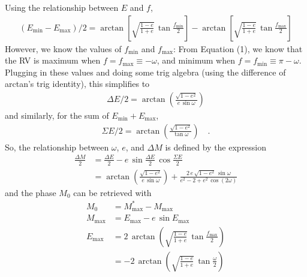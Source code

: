 \documentclass{article}
\begin{document}
Using the relationship between $E$ and $f$,
\begin{align}
    (E_{\mathrm{min}} - E_{\mathrm{max}})/2 =
        \arctan\left[ \sqrt{\frac{1-e}{1+e}} \,
            \tan \frac{f_{\mathrm{min}}}{2} \right] -
        \arctan\left[ \sqrt{\frac{1-e}{1+e}} \,
            \tan \frac{f_{\mathrm{max}}}{2} \right]
\end{align}
However, we know the values of $f_{\mathrm{min}}$ and $f_{\mathrm{max}}$: From
Equation (1), we know that the RV is maximum when $f=f_{\mathrm{max}} \equiv
-\omega$, and minimum when $f=f_{\mathrm{min}} \equiv \pi-\omega$.
Plugging in these values and doing some trig algebra (using the difference of
arctan's trig identity), this simplifies to
\begin{align}
    \Delta E / 2 = \arctan\left(\frac{\sqrt{1 - e^2}}{e\,\sin\omega}\right)
\end{align}
and similarly, for the sum of $E_{\mathrm{min}} + E_{\mathrm{max}}$,
\begin{align}
    \Sigma E / 2 = \arctan\left(\frac{\sqrt{1 - e^2}}{\tan\omega}\right)
        \quad .
\end{align}
So, the relationship between $\omega$, $e$, and $\Delta M$ is defined by the
expression
\begin{align}
    \frac{\Delta M}{2} &= \frac{\Delta E}{2} -
        e\, \sin\frac{\Delta E}{2} \, \cos\frac{\Sigma E}{2} \\
    &= \arctan\left( \frac{\sqrt{1 - e^2}}{e \, \sin\omega} \right) +
        \frac{2\, e \, \sqrt{1 - e^2} \, \sin\omega}{e^2 - 2 + e^2\,\cos(2\omega)}
\end{align}
and the phase $M_0$ can be retrieved with
\begin{align}
    M_0 &= M^*_{\mathrm{max}} - M_{\mathrm{max}} \\
    M_{\mathrm{max}} &= E_{\mathrm{max}} - e \, \sin E_{\mathrm{max}} \\
    E_{\mathrm{max}} &= 2\,\arctan\left(\sqrt{\frac{1-e}{1+e}} \,
        \tan\frac{f_{\mathrm{max}}}{2}\right) \\
    &= -2\,\arctan\left(\sqrt{\frac{1-e}{1+e}} \,
        \tan\frac{\omega}{2}\right) \\
\end{align}
\end{document}
